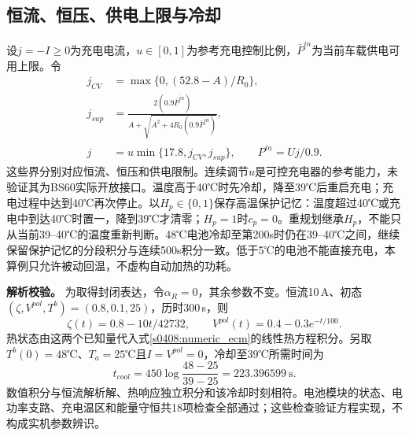 \subsection{恒流、恒压、供电上限与冷却}

设$j=-I\ge0$为充电电流，$u\in[0,1]$为参考充电控制比例，$\bar P^{in}$为当前车载供电可用上限。令
\begin{align}
 j_{CV}&=\max\{0,(52.8-A)/R_0\},\\
 j_{sup}&=\frac{2(0.9\bar P^{in})}{A+\sqrt{A^2+4R_0(0.9\bar P^{in})}},\\
 j&=u\min\{17.8,j_{CV},j_{sup}\},\qquad P^{in}=Uj/0.9.
 \label{s0408:cccv}
\end{align}
这些界分别对应恒流、恒压和供电限制。连续调节$u$是可控充电器的参考能力，未验证其为BS60实际开放接口。温度高于40℃时先冷却，降至39℃后重启充电；充电过程中达到40℃再次停止。以$H_p\in\{0,1\}$保存高温保护记忆：温度超过40℃或充电中到达40℃时置一，降到39℃才清零；$H_p=1$时$c_p=0$。重规划继承$H_p$，不能只从当前39--40℃的温度重新判断。48℃电池冷却至第200s时仍在39--40℃之间，继续保留保护记忆的分段积分与连续500s积分一致。低于5℃的电池不能直接充电，本算例只允许被动回温，不虚构自动加热的功耗。

\textbf{解析校验。} 为取得封闭表达，令$\alpha_R=0$，其余参数不变。恒流10\,A、初态$(\zeta,V^{pol},T^b)=(0.8,0.1,25)$，历时300\,s，则
\begin{equation}
 \zeta(t)=0.8-10t/42732,\qquad
 V^{pol}(t)=0.4-0.3e^{-t/100}.
 \label{s0408:analytic_pulse}
\end{equation}
热状态由这两个已知量代入式\eqref{s0408:numeric_ecm}的线性热方程积分。另取$T^b(0)=48$℃、$T_a=25$℃且$I=V^{pol}=0$，冷却至39℃所需时间为
\begin{equation}
 t_{cool}=450\log\frac{48-25}{39-25}=223.396599\ \mathrm s.
 \label{s0408:cooling_example}
\end{equation}
数值积分与恒流解析解、热响应独立积分和该冷却时刻相符。电池模块的状态、电功率支路、充电温区和能量守恒共18项检查全部通过；这些检查验证方程实现，不构成实机参数辨识。


